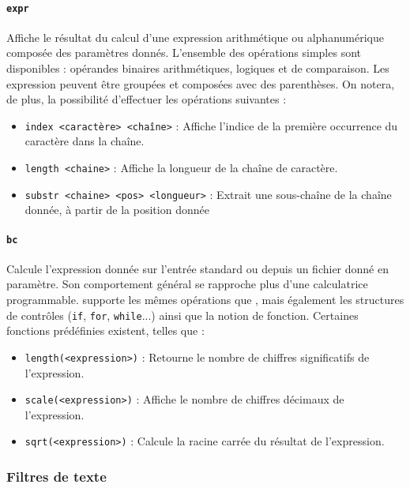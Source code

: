 \paragraph{\texttt{expr}} 
Affiche le résultat du calcul d'une expression arithmétique ou alphanumérique composée des paramètres donnés. L'ensemble des opérations simples sont disponibles : opérandes binaires arithmétiques, logiques et de comparaison. Les expression peuvent être groupées et composées avec des parenthèses. On notera, de plus, la possibilité d'effectuer les opérations suivantes : 
\begin{itemize}
    \item \texttt{index <caractère> <chaîne>} : Affiche l'indice de la première occurrence du caractère dans la chaîne.
    \item \texttt{length <chaine>} : Affiche la longueur de la chaîne de caractère.
    \item \texttt{substr <chaine> <pos> <longueur>} : Extrait une sous-chaîne de la chaîne donnée, à partir de la position donnée
\end{itemize}

\paragraph{\texttt{bc}} 
Calcule l'expression donnée sur l'entrée standard ou depuis un fichier donné en paramètre. Son comportement général se rapproche plus d'une calculatrice programmable.
 supporte les mêmes opérations que , mais également les structures de contrôles (\texttt{if}, \texttt{for}, \texttt{while}...) ainsi que la notion de fonction.
Certaines fonctions prédéfinies existent, telles que :
\begin{itemize}
    \item \texttt{length(<expression>)} : Retourne le nombre de chiffres significatifs de l'expression.
    \item \texttt{scale(<expression>)} : Affiche le nombre de chiffres décimaux de l'expression.
    \item \texttt{sqrt(<expression>)} : Calcule la racine carrée du résultat de l'expression.
\end{itemize}

\newpage


\subsubsection{Filtres de texte}

